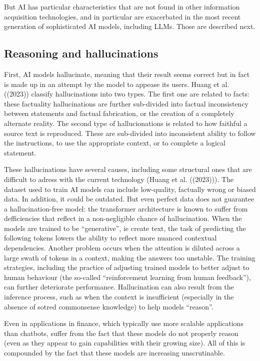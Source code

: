 \documentclass[
]{article}
\theoremstyle{plain}
\theoremstyle{definition}
\theoremstyle{remark}
\begin{document}
But AI has particular characteristics that are not found in other
information acquisition technologies, and in particular are exacerbated
in the most recent generation of sophisticated AI models, including
LLMs. Those are described next.

\hypertarget{reasoning-and-hallucinations}{%
\subsection{Reasoning and
hallucinations}\label{reasoning-and-hallucinations}}

First, AI models hallucinate, meaning that their result seems correct
but in fact is made up in an attempt by the model to appease its users.
Huang et al. ((2023)) classify hallucinations into two types. The first
one are related to facts: these factuality hallucinations are further
sub-divided into factual inconsistency between statements and factual
fabrication, or the creation of a completely alternate reality. The
second type of hallucionations is related to how faithful a source text
is reproduced. These are sub-divided into inconsistent ability to follow
the instructions, to use the appropriate context, or to complete a
logical statement.

These hallucinations have several causes, including some structural ones
that are difficult to adress with the current technology (Huang et al.
((2023))). The dataset used to train AI models can include low-quality,
factually wrong or biased data. In addition, it could be outdated. But
even perfect data does not guarantee a hallucination-free model: the
transformer architecture is known to suffer from defficiencies that
reflect in a non-negligible chance of hallucination. When the models are
trained to be ``generative'', ie create text, the task of predicting the
following tokens lowers the ability to reflect more nuanced contextual
dependencies. Another problem occurs when the attention is diluted
across a large swath of tokens in a context, making the answers too
unstable. The training strategies, including the practice of adjusting
trained models to better adjust to human behaviour (the so-called
``reinforcement learning from human feedback''), can further deteriorate
performance. Hallucination can also result from the inference process,
such as when the context is insufficient (especially in the absence of
sotred commonsense knowledge) to help models ``reason''.

Even in applications in finance, which typically use more scalable
applications than chatbots, suffer from the fact that these models do
not properly reason (even as they appear to gain capabilities with their
growing size). All of this is compounded by the fact that these models
are increasing unscrutinable.
\end{document}
